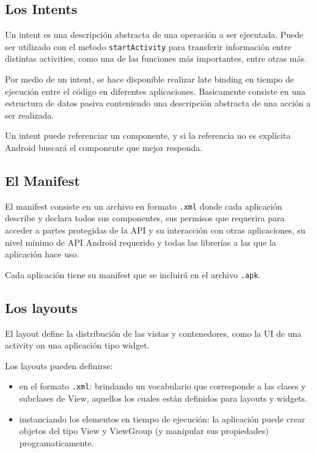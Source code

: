 
\subsection{Los Intents}
\label{subsec:dev.intents}

Un intent es una descripci\'on abstracta de una operaci\'on a ser ejecutada. Puede ser utilizado con el me\'todo \texttt{startActivity} para transferir informaci\'on entre distintas activities, como una de las funciones m\'as importantes, entre otras m\'as.

Por medio de un intent, se hace disponible realizar late binding en tiempo de ejecuci\'on entre el c\'odigo en diferentes aplicaciones. Basicamente consiste en una estructura de datos pasiva conteniendo una descripci\'on abstracta de una acci\'on a ser realizada.

Un intent puede referenciar un componente, y si la referencia no es expl\'icita Android buscar\'a el componente que mejor responda.

\subsection{El Manifest}
\label{subsec:dev.manifest}

El manifest consiste en un archivo en formato \texttt{.xml} donde cada aplicaci\'on describe y declara todos sus componentes, sus permisos que requerira para acceder a partes protegidas de la \ac{API} y su interacci\'on con otras aplicaciones, su nivel m\'inimo de \ac{API} Android requerido y todas las librer\'ias a las que la aplicaci\'on hace uso.

Cada aplicaci\'on tiene su manifest que se incluir\'a en el archivo \texttt{.apk}.

\subsection{Los layouts}
\label{subsec:dev.layouts}

El layout define la distribuci\'on de las vistas y contenedores, como la \ac{UI} de una activity on una aplicaci\'on tipo widget.

Los layouts pueden definirse:

\begin{itemize}
\item en el formato \texttt{.xml}: brindando un vocabulario que corresponde a las clases y subclases de View, aquellos los cuales est\'an definidos para layouts y widgets.
\item instanciando los elementos en tiempo de ejecuci\'on: la aplicaci\'on puede crear objetos del tipo View y ViewGroup (y manipular sus propiedades) programaticamente.
\end{itemize}


